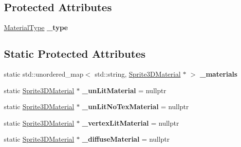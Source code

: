 \subsection*{Protected Attributes}
\begin{DoxyCompactItemize}
\item 
\mbox{\label{classSprite3DMaterial_a403bf05589ea665e038b54828bd1e08f}} 
\hyperlink{classSprite3DMaterial_a2b3cb11be78a5f6332cc01d5b7063e32}{Material\+Type} {\bfseries \+\_\+type}
\end{DoxyCompactItemize}
\subsection*{Static Protected Attributes}
\begin{DoxyCompactItemize}
\item 
\mbox{\label{classSprite3DMaterial_a8a5756fdb745d2c7e99c09c2c80b0573}} 
static std\+::unordered\+\_\+map$<$ std\+::string, \hyperlink{classSprite3DMaterial}{Sprite3\+D\+Material} $\ast$ $>$ {\bfseries \+\_\+materials}
\item 
\mbox{\label{classSprite3DMaterial_ac7994c33f7ca968e5fd0a24c4afb45fc}} 
static \hyperlink{classSprite3DMaterial}{Sprite3\+D\+Material} $\ast$ {\bfseries \+\_\+un\+Lit\+Material} = nullptr
\item 
\mbox{\label{classSprite3DMaterial_aec037a041adbaeabbecb97bab95ab669}} 
static \hyperlink{classSprite3DMaterial}{Sprite3\+D\+Material} $\ast$ {\bfseries \+\_\+un\+Lit\+No\+Tex\+Material} = nullptr
\item 
\mbox{\label{classSprite3DMaterial_acd144fc66340c3479278a17f2ab13073}} 
static \hyperlink{classSprite3DMaterial}{Sprite3\+D\+Material} $\ast$ {\bfseries \+\_\+vertex\+Lit\+Material} = nullptr
\item 
\mbox{\label{classSprite3DMaterial_a3695c68d48a9f43ec31d378e8d20d69a}} 
static \hyperlink{classSprite3DMaterial}{Sprite3\+D\+Material} $\ast$ {\bfseries \+\_\+diffuse\+Material} = nullptr
\item 
\mbox{\label{classSprite3DMaterial_a778bd74f4ba5616f68629874a3a1eb12}} 

\end{DoxyCompactItemize}
